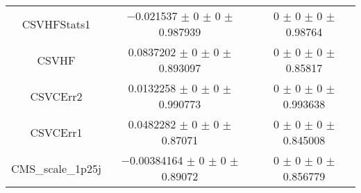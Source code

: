 \begin{table}
\begin{tabular}{ccc}
CSVHFStats1 & \num{-0.021537} $\pm$ \num{0} $\pm$ \num{0} $\pm$ \num{0.987939} & \num{0} $\pm$ \num{0} $\pm$ \num{0} $\pm$ \num{0.98764}\\
CSVHF & \num{0.0837202} $\pm$ \num{0} $\pm$ \num{0} $\pm$ \num{0.893097} & \num{0} $\pm$ \num{0} $\pm$ \num{0} $\pm$ \num{0.85817}\\
CSVCErr2 & \num{0.0132258} $\pm$ \num{0} $\pm$ \num{0} $\pm$ \num{0.990773} & \num{0} $\pm$ \num{0} $\pm$ \num{0} $\pm$ \num{0.993638}\\
CSVCErr1 & \num{0.0482282} $\pm$ \num{0} $\pm$ \num{0} $\pm$ \num{0.87071} & \num{0} $\pm$ \num{0} $\pm$ \num{0} $\pm$ \num{0.845008}\\
CMS\_scale\_1p25j & \num{-0.00384164} $\pm$ \num{0} $\pm$ \num{0} $\pm$ \num{0.89072} & \num{0} $\pm$ \num{0} $\pm$ \num{0} $\pm$ \num{0.856779}\\
\bottomrule
\end{tabular}
\end{table}